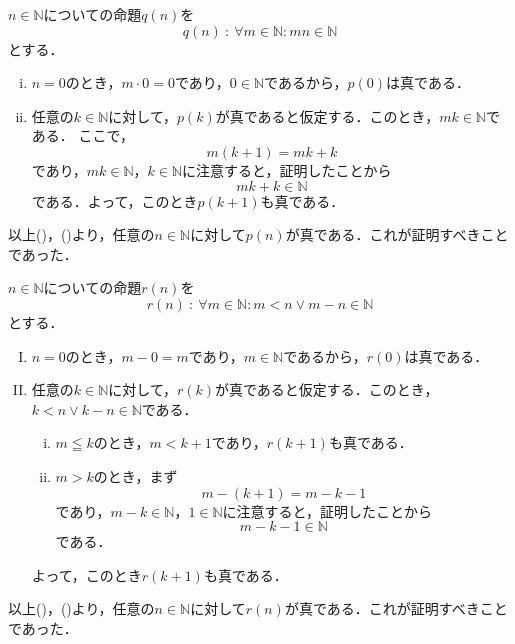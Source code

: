 
\begin{tproof}
    $n \in \mathbb{N}$についての命題$q(n)$を
    \[
        q(n) ~{:}~ \forall m \in \mathbb{N} \colon  mn \in \mathbb{N}
    \]
    とする．
    \begin{enumerate}[(i)]
        \item $n=0$のとき，$m \cdot 0=0$であり，$0 \in \mathbb{N}$であるから，$p(0)$は真である．
        \item 任意の$k \in \mathbb{N}$に対して，$p(k)$が真であると仮定する．このとき，$mk \in \mathbb{N}$である．
              ここで，
              \[
                  m(k+1)=mk + k
              \] であり，$mk \in \mathbb{N}$，$k \in \mathbb{N}$に注意すると，証明したことから
              \[
                  mk + k   \in \mathbb{N}
              \]
              である．よって，このとき$p(k+1)$も真である．
    \end{enumerate}
    以上()，()より，任意の$n \in \mathbb{N}$に対して$p(n)$が真である．これが証明すべきことであった．
\end{tproof}




\begin{tproof}
    $n \in \mathbb{N}$についての命題$r(n)$を
    \[
        r(n) ~{:}~ \forall m \in \mathbb{N} \colon  m<n \lor m-n  \in \mathbb{N}
    \]
    とする．
    \begin{enumerate}[(I)]
        \item $n=0$のとき，$m - 0 =m$であり，$m \in \mathbb{N}$であるから，$r(0)$は真である．
        \item 任意の$k \in \mathbb{N}$に対して，$r(k)$が真であると仮定する．このとき，$k<n \lor k-n  \in \mathbb{N}$である．
              \begin{enumerate}[(i)]
                  \item $m \leqq   k$のとき，$m <k+1$であり，$r(k+1)$も真である．
                  \item $m > k$のとき，まず
                        \[
                            m-(k+1)=m-k-1
                        \] であり，$m-k \in \mathbb{N}$，$1 \in \mathbb{N}$に注意すると，証明したことから
                        \[
                            m-k-1  \in \mathbb{N}
                        \]
                        である．
              \end{enumerate}
              よって，このとき$r(k+1)$も真である．
    \end{enumerate}
    以上()，()より，任意の$n \in \mathbb{N}$に対して$r(n)$が真である．これが証明すべきことであった．
\end{tproof}



